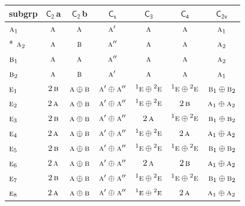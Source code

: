 \documentclass[10pt,a4paper]{article}
\numberwithin{equation}{section}
\newcommand{\grp}[1]{\mathsf{#1}}
\newcommand{\irr}[1]{\text{\normalfont\scshape #1}}
\newcommand{\conjpair}[1]{{}^{#1}}
\newcommand{\clsletter}[1]{\,{\scriptsize\color{black!55}#1}}
\begin{document}
{\small\begin{longtable}{@{}lcccccc@{}}\toprule
subgrp & \href{C2.pdf}{$\grp{C_{2}}$}\clsletter{a} & \href{C2.pdf}{$\grp{C_{2}}$}\clsletter{b} & \href{C1v.pdf}{$\grp{C_{s}}$} & \href{C3.pdf}{$\grp{C_{3}}$} & \href{C4.pdf}{$\grp{C_{4}}$} & \href{C2v.pdf}{$\grp{C_{2v}}$}\\\midrule\endhead
\bottomrule\endfoot\endlastfoot
$\irr{a}_{1}$ & $\irr{a}$ & $\irr{a}$ & $\irr{a}'$ & $\irr{a}$ & $\irr{a}$ & $\irr{a}_{1}$\\*
$\irr{a}_{2}$ & $\irr{a}$ & $\irr{b}$ & $\irr{a}''$ & $\irr{a}$ & $\irr{a}$ & $\irr{a}_{2}$\\
$\irr{b}_{1}$ & $\irr{a}$ & $\irr{a}$ & $\irr{a}''$ & $\irr{a}$ & $\irr{a}$ & $\irr{a}_{2}$\\
$\irr{b}_{2}$ & $\irr{a}$ & $\irr{b}$ & $\irr{a}'$ & $\irr{a}$ & $\irr{a}$ & $\irr{a}_{1}$\\
$\irr{e}_{1}$ & $2\,\irr{b}$ & $\irr{a}\oplus \irr{b}$ & $\irr{a}'\oplus \irr{a}''$ & $\conjpair{1}\irr{e}\oplus \conjpair{2}\irr{e}$ & $\conjpair{1}\irr{e}\oplus \conjpair{2}\irr{e}$ & $\irr{b}_{1}\oplus \irr{b}_{2}$\\
$\irr{e}_{2}$ & $2\,\irr{a}$ & $\irr{a}\oplus \irr{b}$ & $\irr{a}'\oplus \irr{a}''$ & $\conjpair{1}\irr{e}\oplus \conjpair{2}\irr{e}$ & $2\,\irr{b}$ & $\irr{a}_{1}\oplus \irr{a}_{2}$\\
$\irr{e}_{3}$ & $2\,\irr{b}$ & $\irr{a}\oplus \irr{b}$ & $\irr{a}'\oplus \irr{a}''$ & $2\,\irr{a}$ & $\conjpair{1}\irr{e}\oplus \conjpair{2}\irr{e}$ & $\irr{b}_{1}\oplus \irr{b}_{2}$\\
$\irr{e}_{4}$ & $2\,\irr{a}$ & $\irr{a}\oplus \irr{b}$ & $\irr{a}'\oplus \irr{a}''$ & $\conjpair{1}\irr{e}\oplus \conjpair{2}\irr{e}$ & $2\,\irr{a}$ & $\irr{a}_{1}\oplus \irr{a}_{2}$\\
$\irr{e}_{5}$ & $2\,\irr{b}$ & $\irr{a}\oplus \irr{b}$ & $\irr{a}'\oplus \irr{a}''$ & $\conjpair{1}\irr{e}\oplus \conjpair{2}\irr{e}$ & $\conjpair{1}\irr{e}\oplus \conjpair{2}\irr{e}$ & $\irr{b}_{1}\oplus \irr{b}_{2}$\\
$\irr{e}_{6}$ & $2\,\irr{a}$ & $\irr{a}\oplus \irr{b}$ & $\irr{a}'\oplus \irr{a}''$ & $2\,\irr{a}$ & $2\,\irr{b}$ & $\irr{a}_{1}\oplus \irr{a}_{2}$\\
$\irr{e}_{7}$ & $2\,\irr{b}$ & $\irr{a}\oplus \irr{b}$ & $\irr{a}'\oplus \irr{a}''$ & $\conjpair{1}\irr{e}\oplus \conjpair{2}\irr{e}$ & $\conjpair{1}\irr{e}\oplus \conjpair{2}\irr{e}$ & $\irr{b}_{1}\oplus \irr{b}_{2}$\\
$\irr{e}_{8}$ & $2\,\irr{a}$ & $\irr{a}\oplus \irr{b}$ & $\irr{a}'\oplus \irr{a}''$ & $\conjpair{1}\irr{e}\oplus \conjpair{2}\irr{e}$ & $2\,\irr{a}$ & $\irr{a}_{1}\oplus \irr{a}_{2}$\\

\end{longtable}}
\end{document}
